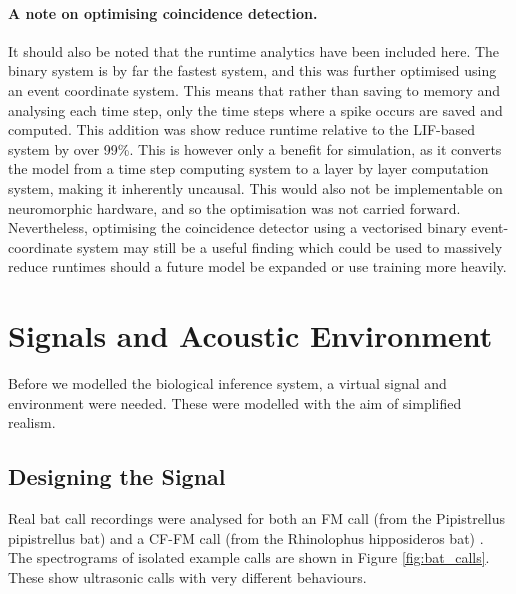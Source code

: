 \paragraph{A note on optimising coincidence detection.} It should also be noted that the runtime analytics have been included here. The binary system is by far the fastest system, and this was further optimised using an event coordinate system. This means that rather than saving to memory and analysing each time step, only the time steps where a spike occurs are saved and computed. This addition was show reduce runtime relative to the LIF-based system by over 99\%. This is however only a benefit for simulation, as it converts the model from a time step computing system to a layer by layer computation system, making it inherently uncausal. This would also not be implementable on neuromorphic hardware, and so the optimisation was not carried forward. Nevertheless, optimising the coincidence detector using a vectorised binary event-coordinate system may still be a useful finding which could be used to massively reduce runtimes should a future model be expanded or use training more heavily.

\section{Signals and Acoustic Environment}

Before we modelled the biological inference system, a virtual signal and environment were needed. These were modelled with the aim of simplified realism. 

\subsection{Designing the Signal}
Real bat call recordings were analysed for both an FM call (from the Pipistrellus pipistrellus bat) and a CF-FM call (from the Rhinolophus hipposideros bat) \cite{BatSounds}. The spectrograms of isolated example calls are shown in Figure \ref{fig:bat_calls}. These show ultrasonic calls with very different behaviours.

